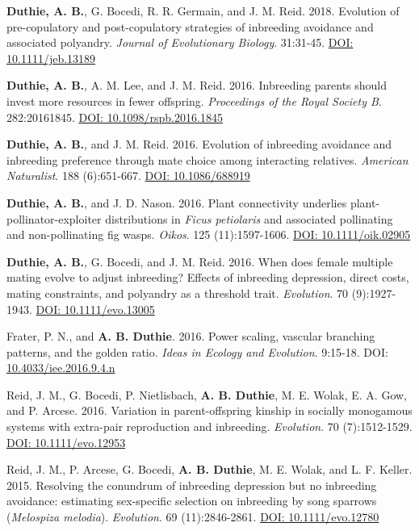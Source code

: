 \documentclass[letterpaper]{article}
\begin{document}
\begin{etaremune}
\item {\bf Duthie, A. B.}, G. Bocedi, R. R. Germain, and J. M. Reid. 2018. Evolution of pre-copulatory and post-copulatory strategies of inbreeding avoidance and associated polyandry. {\it Journal of Evolutionary Biology}. 31:31-45. \href{https://onlinelibrary.wiley.com/doi/10.1111/jeb.13189/full}{DOI: 10.1111/jeb.13189}
\item {\bf Duthie, A. B.}, A. M. Lee, and J. M. Reid. 2016. Inbreeding parents should invest more resources in fewer offspring. {\it Proceedings of the Royal Society B}. 282:20161845. \href{http://rspb.royalsocietypublishing.org/content/283/1843/20161845}{DOI: 10.1098/rspb.2016.1845}
\item {\bf Duthie, A. B.}, and J. M. Reid. 2016. Evolution of inbreeding avoidance and inbreeding preference through mate choice among interacting relatives. {\it American Naturalist}. 188 (6):651-667. \href{http://www.journals.uchicago.edu/doi/full/10.1086/688919}{DOI: 10.1086/688919}
\item {\bf Duthie, A. B.}, and J. D. Nason. 2016. Plant connectivity underlies plant-pollinator-exploiter distributions in {\it Ficus petiolaris} and associated pollinating and non-pollinating fig wasps. {\it Oikos}. 125 (11):1597-1606. \href{http://onlinelibrary.wiley.com/doi/10.1111/oik.02905/abstract}{DOI: 10.1111/oik.02905}
\item {\bf Duthie, A. B.}, G. Bocedi, and J. M. Reid. 2016. When does female multiple mating evolve to adjust inbreeding? Effects of inbreeding depression, direct costs, mating constraints, and polyandry as a threshold trait. {\it Evolution}. 70 (9):1927-1943. \href{http://onlinelibrary.wiley.com/doi/10.1111/evo.13005/abstract}{DOI: 10.1111/evo.13005}
\item Frater, P. N., and {\bf A. B. Duthie}. 2016. Power scaling, vascular branching patterns, and the golden ratio. {\it Ideas in Ecology and Evolution}. 9:15-18. DOI: \href{http://ojs.library.queensu.ca/index.php/IEE/article/view/6312}{10.4033/iee.2016.9.4.n}
\item Reid, J. M., G. Bocedi, P. Nietlisbach, {\bf A. B. Duthie}, M. E. Wolak, E. A. Gow, and P. Arcese. 2016. Variation in parent-offspring kinship in socially monogamous systems with extra-pair reproduction and inbreeding. {\it Evolution}. 70 (7):1512-1529. \href{http://onlinelibrary.wiley.com/doi/10.1111/evo.12953/abstract}{DOI: 10.1111/evo.12953}
\item Reid, J. M., P. Arcese, G. Bocedi, {\bf A. B. Duthie}, M. E. Wolak, and L. F. Keller. 2015. Resolving the conundrum of inbreeding depression but no inbreeding avoidance: estimating sex-specific selection on inbreeding by song sparrows ({\it Melospiza melodia}). {\it Evolution}. 69 (11):2846-2861. \href{http://onlinelibrary.wiley.com/doi/10.1111/evo.12780/abstract}{DOI: 10.1111/evo.12780}

\end{etaremune}
\end{document}
